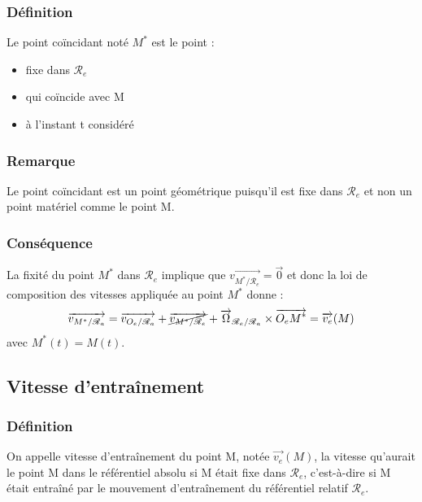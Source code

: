 \documentclass[a4paper,10pt]{book} %
\begin{document}
\subsubsection{Définition}
Le point coïncidant noté $M^*$ est le point :\begin{itemize}[label=$\bullet$]
\item fixe dans $\mathcal{R}_e$
\item qui coïncide avec M
\item à l'instant t considéré
\end{itemize}

\subsubsection{Remarque}
Le point coïncidant est un point géométrique puisqu'il est fixe dans $\mathcal{R}_e$ et non un point matériel comme le point M.

\subsubsection{Conséquence}
La fixité du point $M^*$ dans $\mathcal{R}_e$ implique que $\overrightarrow{v_{M^*/\mathcal{R}_e}} =\overrightarrow{0}$
et donc la loi de composition des vitesses appliquée au point $M^*$ donne :\\
$$\overrightarrow{v_{M^*/\mathcal{R}_a}}=\overrightarrow{v_{O_e/\mathcal{R}_a}}+\cancel{\overrightarrow{v_{M^*/\mathcal{R}_e}}}+\overrightarrow{\Omega}_{\mathcal{R}_e/\mathcal{R}_a}\times \overrightarrow{O_eM^*} =\overrightarrow{v_e}(M)$$ avec $M^*(t)=M(t)$.

\subsection{Vitesse d'entraînement}
\subsubsection{Définition}
On appelle vitesse d’entraînement du point M, notée $\overrightarrow{v_e}(M)$, la vitesse qu'aurait le point M dans le référentiel absolu si M était fixe dans $\mathcal{R}_e$, c'est-à-dire si M était entraîné par le mouvement d'entraînement du référentiel relatif $\mathcal{R}_e$.
\end{document}
